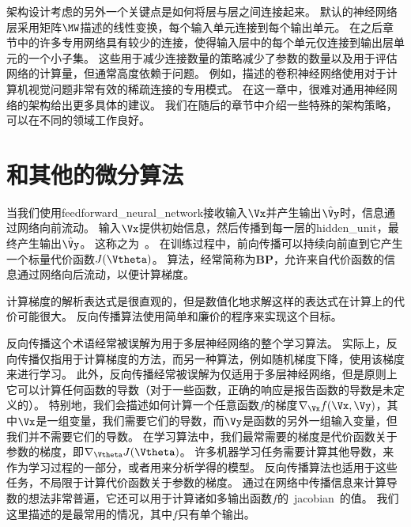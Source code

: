架构设计考虑的另外一个关键点是如何将层与层之间连接起来。
默认的神经网络层采用矩阵$\MW$描述的线性变换，每个输入单元连接到每个输出单元。
在之后章节中的许多专用网络具有较少的连接，使得输入层中的每个单元仅连接到输出层单元的一个小子集。
这些用于减少连接数量的策略减少了参数的数量以及用于评估网络的计算量，但通常高度依赖于问题。
例如，描述的卷积神经网络使用对于计算机视觉问题非常有效的稀疏连接的专用模式。
在这一章中，很难对通用神经网络的架构给出更多具体的建议。
我们在随后的章节中介绍一些特殊的架构策略，可以在不同的领域工作良好。


\section{和其他的微分算法}
\label{sec:back_propagation_and_other_differentiation_algorithms}

当我们使用\gls{feedforward_neural_network}接收输入$\Vx$并产生输出$\hat{\Vy}$时，信息通过网络向前流动。
输入$\Vx$提供初始信息，然后传播到每一层的\gls{hidden_unit}，最终产生输出$\hat{\Vy}$。
这称之为~。
在训练过程中，前向传播可以持续向前直到它产生一个标量代价函数$J(\Vtheta)$。
算法\citep{Rumelhart-et-al-1986a}，经常简称为\textbf{\glsdesc{BP}}，允许来自代价函数的信息通过网络向后流动，以便计算梯度。


计算梯度的解析表达式是很直观的，但是数值化地求解这样的表达式在计算上的代价可能很大。
反向传播算法使用简单和廉价的程序来实现这个目标。

反向传播这个术语经常被误解为用于多层神经网络的整个学习算法。
实际上，反向传播仅指用于计算梯度的方法，而另一种算法，例如随机梯度下降，使用该梯度来进行学习。
此外，反向传播经常被误解为仅适用于多层神经网络，但是原则上它可以计算任何函数的导数（对于一些函数，正确的响应是报告函数的导数是未定义的）。
特别地，我们会描述如何计算一个任意函数$f$的梯度$\nabla_{\Vx} f(\Vx, \Vy)$，其中$\Vx$是一组变量，我们需要它们的导数，而$\Vy$是函数的另外一组输入变量，但我们并不需要它们的导数。
在学习算法中，我们最常需要的梯度是代价函数关于参数的梯度，即$\nabla_{\Vtheta} J(\Vtheta)$。
许多机器学习任务需要计算其他导数，来作为学习过程的一部分，或者用来分析学得的模型。
反向传播算法也适用于这些任务，不局限于计算代价函数关于参数的梯度。
通过在网络中传播信息来计算导数的想法非常普遍，它还可以用于计算诸如多输出函数$f$的~\gls{jacobian}~的值。
我们这里描述的是最常用的情况，其中$f$只有单个输出。

